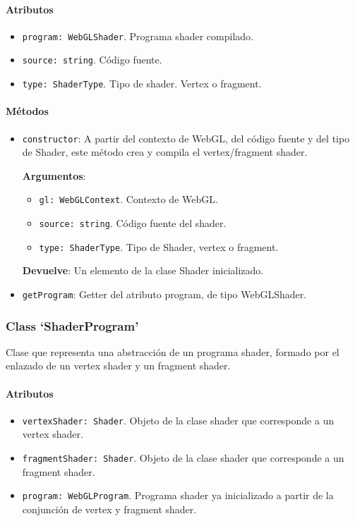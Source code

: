 \paragraph*{Atributos}
\begin{itemize}
    \item \verb|program: WebGLShader|. Programa shader compilado.
    \item \verb|source: string|. Código fuente.
    \item \verb|type: ShaderType|. Tipo de shader. Vertex o fragment.
\end{itemize}

\paragraph*{Métodos}
\begin{itemize}
    \item \verb|constructor|: A partir del contexto de WebGL, del código fuente y del tipo de Shader, este método crea y compila el vertex/fragment shader.
    
    \textbf{Argumentos}:
    \begin{itemize}
        \item \verb|gl: WebGLContext|. Contexto de WebGL.
        \item \verb|source: string|. Código fuente del shader.
        \item \verb|type: ShaderType|. Tipo de Shader, vertex o fragment.
    \end{itemize}
    \textbf{Devuelve}: Un elemento de la clase Shader inicializado.

    \item \verb|getProgram|: Getter del atributo program, de tipo WebGLShader.
\end{itemize}

\subsubsection{Class `ShaderProgram'}
Clase que representa una abstracción de un programa shader, formado por el enlazado de un vertex shader y un fragment shader.

\paragraph*{Atributos}
\begin{itemize}
    \item \verb|vertexShader: Shader|. Objeto de la clase shader que corresponde a un vertex shader.
    \item \verb|fragmentShader: Shader|. Objeto de la clase shader que corresponde a un fragment shader.
    \item \verb|program: WebGLProgram|. Programa shader ya inicializado a partir de la conjunción de vertex y fragment shader.
\end{itemize}

